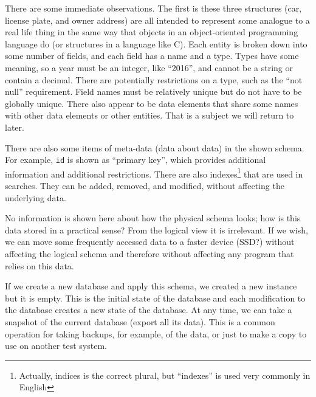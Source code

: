 There are some immediate observations. The first is these three structures (car, license plate, and owner address) are all intended to represent some analogue to a real life thing in the same way that objects in an object-oriented programming language do (or structures in a language like C). Each entity is broken down into some number of fields, and each field has a name and a type. Types have some meaning, so a year must be an integer, like ``2016'', and cannot be a string or contain a decimal. There are potentially restrictions on a type, such as the ``not null'' requirement. Field names must be relatively unique but do not have to be globally unique. There also appear to be data elements that share some names with other data elements or other entities. That is a subject we will return to later.

There are also some items of meta-data (data about data) in the shown schema. For example, \texttt{id} is shown as ``primary key'', which provides additional information and additional restrictions. There are also indexes\footnote{Actually, indices is the correct plural, but ``indexes'' is used very commonly in English} that are used in searches. They can be added, removed, and modified, without affecting the underlying data.

No information is shown here about how the physical schema looks; how is this data stored in a practical sense? From the logical view it is irrelevant. If we wish, we can move some frequently accessed data to a faster device (SSD?) without affecting the logical schema and therefore without affecting any program that relies on this data. 

If we create a new database and apply this schema, we created a new instance but it is empty. This is the initial state of the database and each modification to the database creates a new state of the database. At any time, we can take a snapshot of the current database (export all its data). This is a common operation for taking backups, for example, of the data, or just to make a copy to use on another test system.

